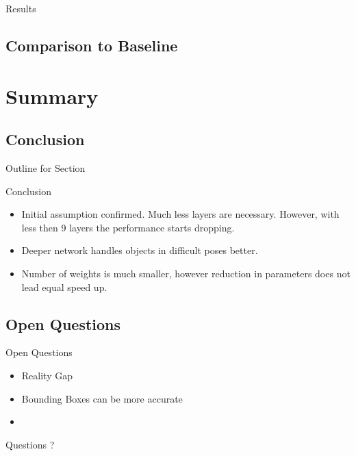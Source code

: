 \documentclass{beamer}
\begin{document}
\begin{darkframes}
\begin{frame}{Results}
\end{frame}

  \subsection{Comparison to Baseline}

    
    \section{Summary}
       \subsection{Conclusion}
            \begin{frame}{Outline for Section \thesection}
    \tableofcontents[currentsection]
\end{frame}
    \begin{frame}{Conclusion}

    \begin{itemize}
    	\item Initial assumption confirmed. Much less layers are necessary. However, with less then 9 layers the performance starts dropping.
    	\item Deeper network handles objects in difficult poses better.
    	\item Number of weights is much smaller, however reduction in parameters does not lead equal speed up.
    \end{itemize}
    \end{frame}

   \subsection{Open Questions}
       \begin{frame}{Open Questions}
\begin{itemize}
	\item Reality Gap
	\item Bounding Boxes can be more accurate
	\item 
  \end{itemize} 
\end{frame}
    \begin{frame}{Questions}
    \centering
\huge ?
    	\end{frame}
    
    
  \end{darkframes}
\end{document}
